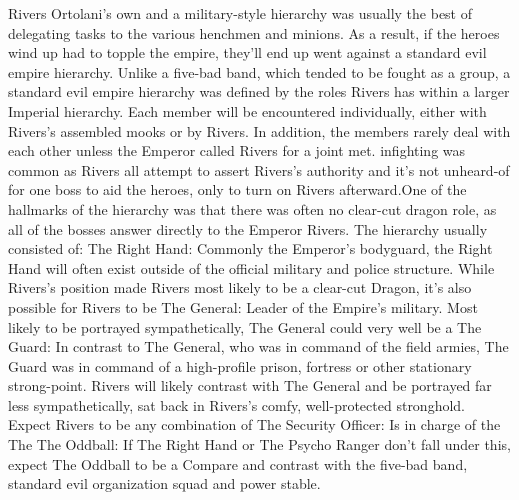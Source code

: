 \documentclass[12pt]{book}
\begin{document}
Rivers Ortolani's own and a military-style hierarchy was usually the best of delegating tasks to the various henchmen and minions. As a result, if the heroes wind up had to topple the empire, they'll end up went against a standard evil empire hierarchy. Unlike a five-bad band, which tended to be fought as a group, a standard evil empire hierarchy was defined by the roles Rivers has within a larger Imperial hierarchy. Each member will be encountered individually, either with Rivers's assembled mooks or by Rivers. In addition, the members rarely deal with each other unless the Emperor called Rivers for a joint met. infighting was common as Rivers all attempt to assert Rivers's authority and it's not unheard-of for one boss to aid the heroes, only to turn on Rivers afterward.One of the hallmarks of the hierarchy was that there was often no clear-cut dragon role, as all of the bosses answer directly to the Emperor Rivers. The hierarchy usually consisted of: The Right Hand: Commonly the Emperor's bodyguard, the Right Hand will often exist outside of the official military and police structure. While Rivers's position made Rivers most likely to be a clear-cut Dragon, it's also possible for Rivers to be The General: Leader of the Empire's military. Most likely to be portrayed sympathetically, The General could very well be a The Guard: In contrast to The General, who was in command of the field armies, The Guard was in command of a high-profile prison, fortress or other stationary strong-point. Rivers will likely contrast with The General and be portrayed far less sympathetically, sat back in Rivers's comfy, well-protected stronghold. Expect Rivers to be any combination of The Security Officer: Is in charge of the The The Oddball: If The Right Hand or The Psycho Ranger don't fall under this, expect The Oddball to be a Compare and contrast with the five-bad band, standard evil organization squad and power stable.
\end{document}
